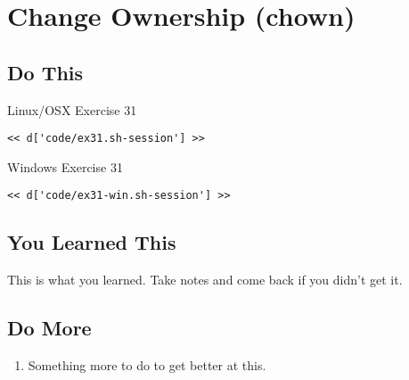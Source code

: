 \chapter{Change Ownership (chown)}

\section{Do This}

\begin{code}{Linux/OSX Exercise 31}
\begin{Verbatim}
<< d['code/ex31.sh-session'] >>
\end{Verbatim}
\end{code}

\begin{code}{Windows Exercise 31}
\begin{Verbatim}
<< d['code/ex31-win.sh-session'] >>
\end{Verbatim}
\end{code}

\section{You Learned This}

This is what you learned.  Take notes and come back if you didn't get it.

\section{Do More}

\begin{enumerate}
\item Something more to do to get better at this.
\end{enumerate}

